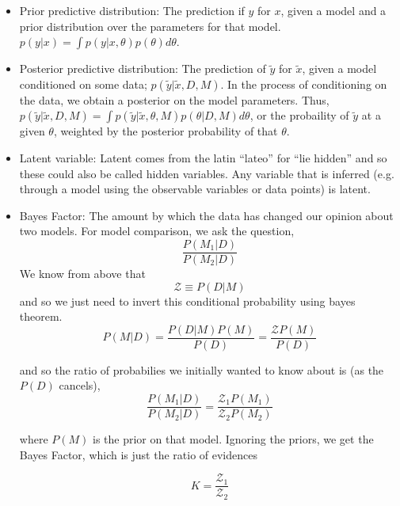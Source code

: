 \documentclass{article}
\begin{document}
\begin{itemize}
    \item Prior predictive distribution: The prediction if $y$ for $x$, given a model and a prior distribution over the parameters for that model. $p(y | x) = \int p(y | x, \theta) p(\theta) d\theta$.

    \item Posterior predictive distribution: The prediction of $\tilde{y}$ for $\tilde{x}$, given a model conditioned on some data; $p(\tilde{y} | \tilde{x}, D, M)$. In the process of conditioning on the data, we obtain a posterior on the model parameters. Thus, $p(\tilde{y} | \tilde{x}, D, M) = \int p(\tilde{y} | \tilde{x}, \theta, M) p(\theta | D, M) d\theta$, or the probaility of $\tilde{y}$ at a given $\theta$, weighted by the posterior probability of that $\theta$.

    \item Latent variable: Latent comes from the latin ``lateo'' for ``lie hidden'' and so these could also be called hidden variables. Any variable that is inferred (e.g. through a model using the observable variables or data points) is latent.

    \item Bayes Factor: The amount by which the data has changed our opinion about two models. For model comparison, we ask the question,
        \begin{equation}
            \frac{P(M_1 | D)}{P(M_2 | D)}
        \end{equation}
        We know from above that
        \begin{equation}
            \mathcal{Z} \equiv P(D | M)
        \end{equation}
        and so we just need to invert this conditional probability using bayes theorem.
        \begin{equation}
            P(M | D) = \frac{P(D | M) P(M)}{P(D)} = \frac{\mathcal{Z} P(M)}{P(D)}
        \end{equation}

        and so the ratio of probabilies we initially wanted to know about is (as the $P(D)$ cancels),
        \begin{equation}
            \frac{P(M_1 | D)}{P(M_2 | D)} = \frac{\mathcal{Z}_1 P(M_1)}{\mathcal{Z}_2 P(M_2)}
        \end{equation}

        where $P(M)$ is the prior on that model. Ignoring the priors, we get the Bayes Factor, which is just the ratio of evidences

        \begin{equation}
            K = \frac{\mathcal{Z}_1}{\mathcal{Z}_2}
        \end{equation}
\end{itemize}
\end{document}

